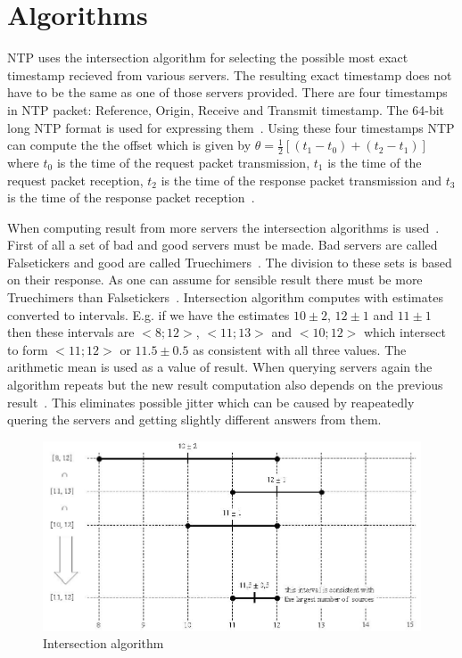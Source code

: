 
\section{Algorithms}
NTP uses the intersection algorithm for selecting the possible most exact timestamp recieved
from various servers. The resulting exact timestamp does not have to be the same
as one of those servers provided.
There are four timestamps in NTP packet: Reference, Origin, Receive and Transmit timestamp.
The 64-bit long NTP format is used for expressing them~\cite{rfc5905}.
Using these four timestamps NTP can compute the
the offset which is given by $\theta = \frac{1}{2}[(t_1 - t_0) + (t_2 - t_1)]$
where $t_0$ is the time of the request packet transmission,
$t_1$ is the time of the request packet reception,
$t_2$ is the time of the response packet transmission and
$t_3$ is the time of the response packet reception~\cite{ntp-algor}.

When computing result from more servers the intersection algorithms is used~\cite{rfc5905}.
First of all a set of bad and good servers must be made.
Bad servers are called Falsetickers and good are called Truechimers~\cite{rfc5905}.
The division to these sets is based on their response.
As one can assume for sensible result there must be more Truechimers than Falsetickers~\cite{rfc5905}.
Intersection algorithm computes with estimates converted to intervals.
E.g. if we have the estimates $10 \pm 2$, $12 \pm 1$ and $11 \pm 1$
then these intervals are $<8; 12>$, $<11; 13>$ and $<10; 12>$ which
intersect to form $<11; 12>$ or $11.5 \pm 0.5$ as consistent with all three values.
The arithmetic mean is used as a value of result.
When querying servers again the algorithm repeats but the new result computation
also depends on the previous result~\cite{rfc5905}.
This eliminates possible jitter which can be caused by reapeatedly quering the servers
and getting slightly different answers from them.

\begin{figure}
	\centering
	\includegraphics[width=13cm,keepaspectratio]{fig/Marzullo_example-1.jpg}
	\caption{Intersection algorithm}
	\label{fig:ntp-intersection}
	\bigskip
\end{figure}

